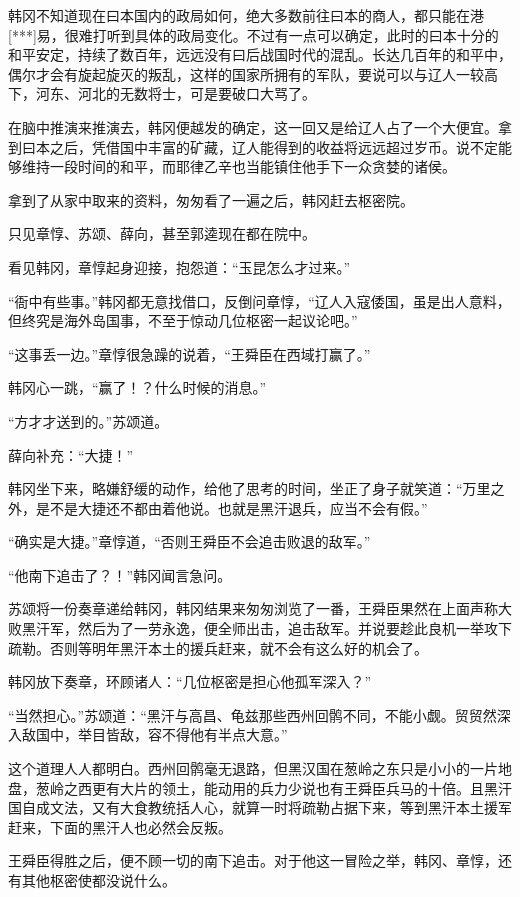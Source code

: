 韩冈不知道现在曰本国内的政局如何，绝大多数前往曰本的商人，都只能在港[***]易，很难打听到具体的政局变化。不过有一点可以确定，此时的曰本十分的和平安定，持续了数百年，远远没有曰后战国时代的混乱。长达几百年的和平中，偶尔才会有旋起旋灭的叛乱，这样的国家所拥有的军队，要说可以与辽人一较高下，河东、河北的无数将士，可是要破口大骂了。

在脑中推演来推演去，韩冈便越发的确定，这一回又是给辽人占了一个大便宜。拿到曰本之后，凭借国中丰富的矿藏，辽人能得到的收益将远远超过岁币。说不定能够维持一段时间的和平，而耶律乙辛也当能镇住他手下一众贪婪的诸侯。

拿到了从家中取来的资料，匆匆看了一遍之后，韩冈赶去枢密院。

只见章惇、苏颂、薛向，甚至郭逵现在都在院中。

看见韩冈，章惇起身迎接，抱怨道：“玉昆怎么才过来。”

“衙中有些事。”韩冈都无意找借口，反倒问章惇，“辽人入寇倭国，虽是出人意料，但终究是海外岛国事，不至于惊动几位枢密一起议论吧。”

“这事丢一边。”章惇很急躁的说着，“王舜臣在西域打赢了。”

韩冈心一跳，“赢了！？什么时候的消息。”

“方才才送到的。”苏颂道。

薛向补充：“大捷！”

韩冈坐下来，略嫌舒缓的动作，给他了思考的时间，坐正了身子就笑道：“万里之外，是不是大捷还不都由着他说。也就是黑汗退兵，应当不会有假。”

“确实是大捷。”章惇道，“否则王舜臣不会追击败退的敌军。”

“他南下追击了？！”韩冈闻言急问。

苏颂将一份奏章递给韩冈，韩冈结果来匆匆浏览了一番，王舜臣果然在上面声称大败黑汗军，然后为了一劳永逸，便全师出击，追击敌军。并说要趁此良机一举攻下疏勒。否则等明年黑汗本土的援兵赶来，就不会有这么好的机会了。

韩冈放下奏章，环顾诸人：“几位枢密是担心他孤军深入？”

“当然担心。”苏颂道：“黑汗与高昌、龟兹那些西州回鹘不同，不能小觑。贸贸然深入敌国中，举目皆敌，容不得他有半点大意。”

这个道理人人都明白。西州回鹘毫无退路，但黑汉国在葱岭之东只是小小的一片地盘，葱岭之西更有大片的领土，能动用的兵力少说也有王舜臣兵马的十倍。且黑汗国自成文法，又有大食教统括人心，就算一时将疏勒占据下来，等到黑汗本土援军赶来，下面的黑汗人也必然会反叛。

王舜臣得胜之后，便不顾一切的南下追击。对于他这一冒险之举，韩冈、章惇，还有其他枢密使都没说什么。

